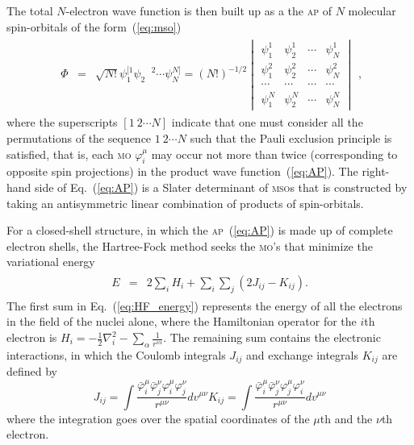The total $N$-electron wave function is then built up as a the
\textsc{ap} of $N$ molecular spin-orbitals of the
form~(\ref{eq:mso})~\cite{Roothaan_HF}
%
\begin{eqnarray}
  \begin{split}
    \Phi & = & \sqrt{N!}\psi_{1}^{[1} \psi_{2}^{\phantom{[]}2} \cdots \psi_{N}^{N]} =
    (N!)^{-1/2}
    \begin{vmatrix}
      \psi_{1}^{1} & \psi_{2}^{1} & \cdots & \psi_{N}^{1} \\
      \psi_{1}^{2} & \psi_{2}^{2} & \cdots & \psi_{N}^{2} \\
      \cdots & \cdots & \cdots & \cdots \\
      \psi_{1}^{N} & \psi_{2}^{N} & \cdots & \psi_{N}^{N}
    \end{vmatrix}
  \end{split},
  \label{eq:AP}
\end{eqnarray}
%
where the superscripts $[1\ 2 \cdots N]$ indicate that one must
consider all the permutations of the sequence $1\ 2 \cdots N$ such
that the Pauli exclusion principle is satisfied, that is, each
\textsc{mo} $\varphi_{i}^{\mu}$ may occur not more than twice
(corresponding to opposite spin projections) in the product wave
function~(\ref{eq:AP}). The right-hand side of Eq.~(\ref{eq:AP}) is a
Slater determinant of \textsc{mso}s that is constructed by taking an
antisymmetric linear combination of products of spin-orbitals.

For a closed-shell structure, in which the \textsc{ap}~(\ref{eq:AP})
is made up of complete electron shells, the Hartree-Fock method seeks
the \textsc{mo}'s that minimize the variational
energy~\cite{Roothaan_HF}
%
\begin{eqnarray}
  \begin{split}
    E & = & 2\sum\limits_{i} H_{i} + \sum\limits_{i}\sum\limits_{j} (2J_{ij} -
    K_{ij}).
  \end{split}
  \label{eq:HF_energy}
\end{eqnarray}
%
The first sum in Eq.~(\ref{eq:HF_energy}) represents the energy of all
the electrons in the field of the nuclei alone, where the Hamiltonian
operator for the $i$th electron is $H_{i} = -\frac{1}{2}
\nabla_{i}^{2} - \sum\limits_{\alpha} \frac{1}{r^{i\alpha}}$. The
remaining sum contains the electronic interactions, in which the
Coulomb integrals $J_{ij}$ and exchange integrals $K_{ij}$ are defined
by
%
\begin{subequations}
  \begin{equation} \label{eq:Coulomb}
    J_{ij} = \int \frac{\bar\varphi_{i}^{\mu} \bar\varphi_{j}^{\nu}
      \varphi_{i}^{\mu} \varphi_{j}^{\nu}}{r^{\mu\nu}} dv^{\mu\nu}
  \end{equation}
  \begin{equation} \label{eq:exchange}
    K_{ij} = \int \frac{\bar\varphi_{i}^{\mu} \bar\varphi_{j}^{\nu}
      \varphi_{j}^{\mu} \varphi_{i}^{\nu}}{r^{\mu\nu}} dv^{\mu\nu}
  \end{equation}
\end{subequations}
%
where the integration goes over the spatial coordinates of the
$\mu$th and the $\nu$th electron.

